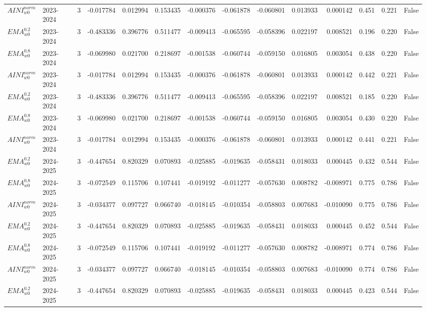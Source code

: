 \begin{tabular}{@{}llrrrrrrrrrlll@{}}
$AINI^{norm}_{w0}$ & 2023-2024 & 3 & -0.017784 & 0.012994 & 0.153435 & -0.000376 & -0.061878 & -0.060801 & 0.013933 & 0.000142 & 0.451 & 0.221 & False \\
$EMA^{0.2}_{w0}$ & 2023-2024 & 3 & -0.483336 & 0.396776 & 0.511477 & -0.009413 & -0.065595 & -0.058396 & 0.022197 & 0.008521 & 0.196 & 0.220 & False \\
$EMA^{0.8}_{w0}$ & 2023-2024 & 3 & -0.069980 & 0.021700 & 0.218697 & -0.001538 & -0.060744 & -0.059150 & 0.016805 & 0.003054 & 0.438 & 0.220 & False \\
$AINI^{norm}_{w0}$ & 2023-2024 & 3 & -0.017784 & 0.012994 & 0.153435 & -0.000376 & -0.061878 & -0.060801 & 0.013933 & 0.000142 & 0.442 & 0.221 & False \\
$EMA^{0.2}_{w0}$ & 2023-2024 & 3 & -0.483336 & 0.396776 & 0.511477 & -0.009413 & -0.065595 & -0.058396 & 0.022197 & 0.008521 & 0.185 & 0.220 & False \\
$EMA^{0.8}_{w0}$ & 2023-2024 & 3 & -0.069980 & 0.021700 & 0.218697 & -0.001538 & -0.060744 & -0.059150 & 0.016805 & 0.003054 & 0.430 & 0.220 & False \\
$AINI^{norm}_{w0}$ & 2023-2024 & 3 & -0.017784 & 0.012994 & 0.153435 & -0.000376 & -0.061878 & -0.060801 & 0.013933 & 0.000142 & 0.441 & 0.221 & False \\
$EMA^{0.2}_{w0}$ & 2024-2025 & 3 & -0.447654 & 0.820329 & 0.070893 & -0.025885 & -0.019635 & -0.058431 & 0.018033 & 0.000445 & 0.432 & 0.544 & False \\
$EMA^{0.8}_{w0}$ & 2024-2025 & 3 & -0.072549 & 0.115706 & 0.107441 & -0.019192 & -0.011277 & -0.057630 & 0.008782 & -0.008971 & 0.775 & 0.786 & False \\
$AINI^{norm}_{w0}$ & 2024-2025 & 3 & -0.034377 & 0.097727 & 0.066740 & -0.018145 & -0.010354 & -0.058803 & 0.007683 & -0.010090 & 0.775 & 0.786 & False \\
$EMA^{0.2}_{w0}$ & 2024-2025 & 3 & -0.447654 & 0.820329 & 0.070893 & -0.025885 & -0.019635 & -0.058431 & 0.018033 & 0.000445 & 0.452 & 0.544 & False \\
$EMA^{0.8}_{w0}$ & 2024-2025 & 3 & -0.072549 & 0.115706 & 0.107441 & -0.019192 & -0.011277 & -0.057630 & 0.008782 & -0.008971 & 0.774 & 0.786 & False \\
$AINI^{norm}_{w0}$ & 2024-2025 & 3 & -0.034377 & 0.097727 & 0.066740 & -0.018145 & -0.010354 & -0.058803 & 0.007683 & -0.010090 & 0.774 & 0.786 & False \\
$EMA^{0.2}_{w0}$ & 2024-2025 & 3 & -0.447654 & 0.820329 & 0.070893 & -0.025885 & -0.019635 & -0.058431 & 0.018033 & 0.000445 & 0.423 & 0.544 & False \\

\end{tabular}

